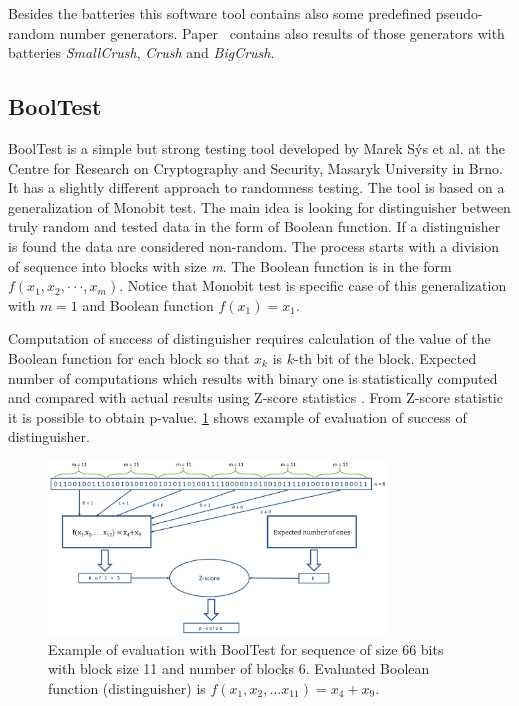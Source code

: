\documentclass[
    digital,    %
    oneside,    %
    color,
    11pt,
    nocover,
    notable,
    nolof,
    nolot,
    final
]{fithesis3}
\renewcommand\_{\textunderscore\allowbreak}
\begin{document}
Besides the batteries this software tool contains also some predefined pseudo-random number generators. Paper~\cite{l2007testu01} contains also results of those generators with batteries \textit{SmallCrush}, \textit{Crush} and \textit{BigCrush}.

\subsection{BoolTest}
\label{sec:booltest-theory}

BoolTest is a simple but strong testing tool developed by Marek Sýs et al. at the Centre for Research on Cryptography and Security, Masaryk University in Brno. It has a slightly different approach to randomness testing. The tool is based on a generalization of Monobit test. The main idea is looking for distinguisher between truly random and tested data in the form of Boolean function. If a distinguisher is found the data are considered non-random. The process starts with a division of sequence into blocks with size \textit{m}. The Boolean function is in the form $f(x_{1}, x_{2}, \cdot \cdot \cdot, x_{m})$. Notice that Monobit test is specific case of this generalization with $m = 1$ and Boolean function $f(x_{1}) = x_{1}$. 

Computation of success of distinguisher requires calculation of the value of the Boolean function for each block so that $x_{k}$ is $k$-th bit of the block.
Expected number of computations which results with binary one is statistically computed and compared with actual results using Z-score statistics \cite{sheskin2003handbook}. From Z-score statistic it is possible to obtain p-value. \cref{fig:bool-test} shows example of evaluation of success of distinguisher.

\begin{figure}[h]
	\centering
	\includegraphics[width=0.8\textwidth]{./images/pictures/bool-test.png}
	\caption{Example of evaluation with BoolTest for sequence of size 66 bits with block size 11 and number of blocks 6. Evaluated Boolean function (distinguisher) is $f(x_1,x_2, . . . x_{11}) = x_4+x_9$.}
	\label{fig:bool-test}
\end{figure}
\end{document}
